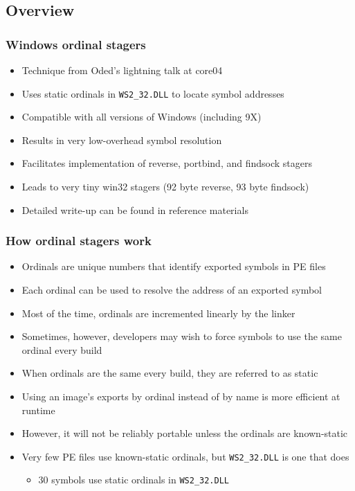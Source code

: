 \documentclass{beamer}
\newenvironment{sitemize}{\vspace{1mm}\begin{itemize}\itemsep 4pt\small}{\end{itemize}}
\begin{document}
\subsection{Overview}
\begin{frame}[t]
    \frametitle{Windows ordinal stagers}

    \begin{sitemize}
        \item Technique from Oded's lightning talk at core04
        \item Uses static ordinals in \texttt{WS2\_32.DLL} to locate symbol
        addresses
        \item Compatible with all versions of Windows (including 9X)
        \item Results in very low-overhead symbol resolution
        \item Facilitates implementation of reverse, portbind, and
        findsock stagers
        \item Leads to very tiny win32 stagers (92 byte reverse, 93
        byte findsock)
        \item Detailed write-up can be found in reference materials
    \end{sitemize}
\end{frame}

\begin{frame}[t]
    \frametitle{How ordinal stagers work}

    \begin{sitemize}
        \item Ordinals are unique numbers that identify exported
        symbols in PE files
        \item Each ordinal can be used to resolve the address of an
        exported symbol

        \pause
        \item Most of the time, ordinals are incremented linearly by the
        linker
        \item Sometimes, however, developers may wish to force
        symbols to use the same ordinal every build
        \item When ordinals are the same every build, they are
        referred to as static

        \pause
        \item Using an image's exports by ordinal instead of by name
        is more efficient at runtime
        \item However, it will not be reliably portable unless the
        ordinals are known-static

        \pause
        \item Very few PE files use known-static ordinals, but
        \texttt{WS2\_32.DLL} is one that does
        \begin{sitemize}
            \item 30 symbols use static ordinals in
            \texttt{WS2\_32.DLL}
        \end{sitemize}
    \end{sitemize}
\end{frame}
\end{document}
